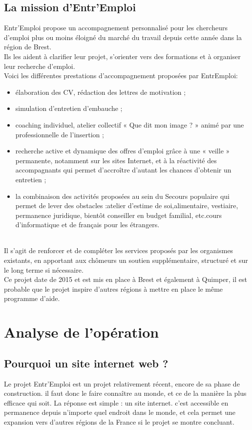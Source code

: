 \documentclass[a4paper, 12pt]{report}
\begin{document}
\section{La mission d'Entr'Emploi}
Entr'Emploi propose un accompagnement personnalisé pour les chercheurs d'emploi plus ou moins éloigné du marché du travail depuis cette année dans la région de Brest.\\
Ils les aident à clarifier leur projet, s'orienter vers des formations et à organiser leur recherche d'emploi.\\
Voici les différentes prestations d’accompagnement proposées par EntrEmploi:
\begin{itemize}
\item élaboration des CV, rédaction des lettres de motivation ;
\item simulation d’entretien d’embauche ;
\item coaching individuel, atelier collectif « Que dit mon image ? » animé par une professionnelle de l’insertion ;
\item recherche active et dynamique des offres d’emploi grâce à une « veille » permanente, notamment sur les sites Internet, et à la réactivité des accompagnants qui permet d’accroître d’autant les chances d’obtenir un entretien ;
\item la combinaison des activités proposées au sein du Secours populaire qui permet de lever des obstacles :atelier d’estime de soi,alimentaire, vestiaire, permanence juridique, bientôt conseiller en budget familial, etc.cours d’informatique et de français pour les étrangers.
\end{itemize}
\ \\
Il s'agit de renforcer et de compléter les services proposés par les organismes existants, en apportant aux chômeurs un soutien supplémentaire, structuré et sur le long terme si nécessaire.\\
Ce projet date de 2015 et est mis en place à Brest et également à Quimper, il est probable que le projet inspire d'autres régions à mettre en place le même programme d'aide.\\


\chapter{Analyse de l’opération}
\thispagestyle{fancy}
\section{Pourquoi un site internet web ?}
Le projet Entr'Emploi est un projet relativement récent, encore de sa phase de construction. il faut donc le faire
connaître au monde, et ce de la manière la plus efficace qui soit. La réponse est simple : un site internet.
c'est accessible en permanence depuis n'importe quel endroit dans le monde, et cela permet une expansion vers d'autres
régions de la France si le projet se montre concluant.
\end{document}
